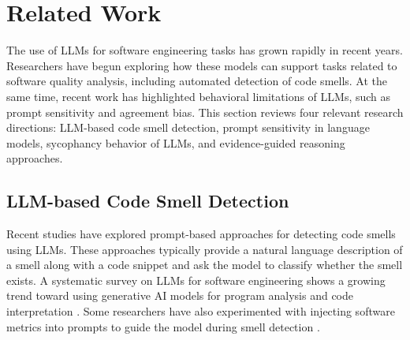 \documentclass[sigconf,review,anonymous]{acmart}
\begin{document}




\section{Related Work}

The use of LLMs for software engineering tasks has grown rapidly in recent years. 
Researchers have begun exploring how these models can support tasks related to software quality analysis, including automated detection of code smells. 
At the same time, recent work has highlighted behavioral limitations of LLMs, such as prompt sensitivity and agreement bias. This section reviews four relevant research directions: LLM-based code smell detection, prompt sensitivity in language models, sycophancy behavior of LLMs, and evidence-guided reasoning approaches.

\subsection{LLM-based Code Smell Detection}

Recent studies have explored prompt-based approaches for detecting code smells using LLMs. 
These approaches typically provide a natural language description of a smell along with a code snippet and ask the model to classify whether the smell exists. A systematic survey on LLMs for software engineering shows a growing trend toward using generative AI models for program analysis and code interpretation \cite{hou2024large}. Some researchers have also experimented with injecting software metrics into prompts to guide the model during smell detection \cite{sousa2025}.
\end{document}

